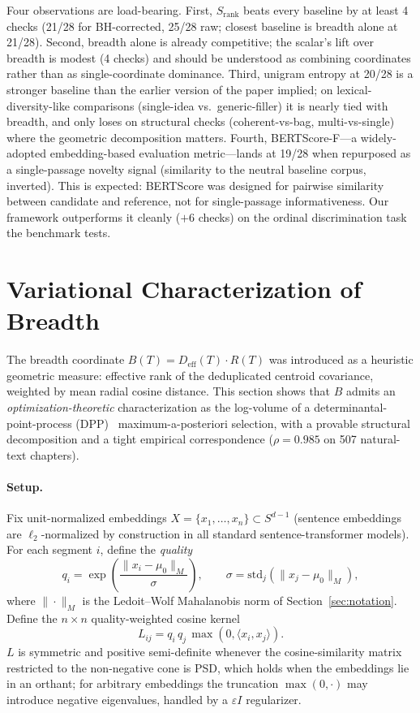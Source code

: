 \documentclass[11pt]{article}
\begin{document}
Four observations are load-bearing. First, $S_{\mathrm{rank}}$ beats every baseline by at least 4 checks (21/28 for BH-corrected, 25/28 raw; closest baseline is breadth alone at 21/28). Second, breadth alone is already competitive; the scalar's lift over breadth is modest (4 checks) and should be understood as combining coordinates rather than as single-coordinate dominance. Third, unigram entropy at 20/28 is a stronger baseline than the earlier version of the paper implied; on lexical-diversity-like comparisons (single-idea vs.\ generic-filler) it is nearly tied with breadth, and only loses on structural checks (coherent-vs-bag, multi-vs-single) where the geometric decomposition matters. Fourth, BERTScore-F---a widely-adopted embedding-based evaluation metric---lands at 19/28 when repurposed as a single-passage novelty signal (similarity to the neutral baseline corpus, inverted). This is expected: BERTScore was designed for pairwise similarity between candidate and reference, not for single-passage informativeness. Our framework outperforms it cleanly ($+6$ checks) on the ordinal discrimination task the benchmark tests.

\section{Variational Characterization of Breadth}\label{sec:variational}

The breadth coordinate $B(T) = D_{\mathrm{eff}}(T) \cdot R(T)$ was introduced as a heuristic geometric measure: effective rank of the deduplicated centroid covariance, weighted by mean radial cosine distance. This section shows that $B$ admits an \emph{optimization-theoretic} characterization as the log-volume of a determinantal-point-process (DPP)~\cite{kulesza2012dpp} maximum-a-posteriori selection, with a provable structural decomposition and a tight empirical correspondence ($\rho = 0.985$ on 507 natural-text chapters).

\paragraph{Setup.} Fix unit-normalized embeddings $X = \{x_1, \ldots, x_n\} \subset S^{d-1}$ (sentence embeddings are $\ell_2$-normalized by construction in all standard sentence-transformer models). For each segment $i$, define the \emph{quality}
\[
q_i = \exp\!\left( \frac{\|x_i - \mu_0\|_M}{\sigma} \right), \qquad \sigma = \mathrm{std}_j\!\left( \|x_j - \mu_0\|_M \right),
\]
where $\|\cdot\|_M$ is the Ledoit--Wolf Mahalanobis norm of Section~\ref{sec:notation}. Define the $n \times n$ quality-weighted cosine kernel
\[
L_{ij} = q_i \, q_j \, \max(0, \langle x_i, x_j \rangle).
\]
$L$ is symmetric and positive semi-definite whenever the cosine-similarity matrix restricted to the non-negative cone is PSD, which holds when the embeddings lie in an orthant; for arbitrary embeddings the truncation $\max(0, \cdot)$ may introduce negative eigenvalues, handled by a $\varepsilon I$ regularizer.
\end{document}
